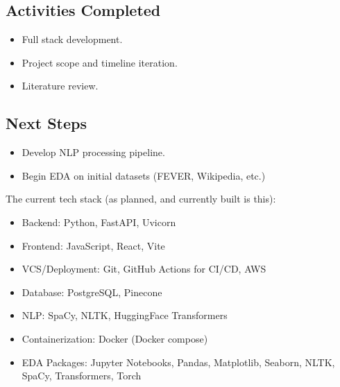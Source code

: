 \documentclass[11pt,letterpaper]{article}
\newcommand{\activities}[1]{
    \subsection*{Activities Completed}
    #1
}
\newcommand{\findings}[1]{
    \subsection*{Key Findings}
    #1
}
\newcommand{\nextSteps}[1]{
    \subsection*{Next Steps}
    #1
}
\begin{document}
\activities{
\begin{itemize}
    \item Full stack development.
    \item Project scope and timeline iteration.
    \item Literature review.
\end{itemize}

}

    

\nextSteps{
    \begin{itemize}
        \item Develop NLP processing pipeline.
        \item Begin EDA on initial datasets (FEVER, Wikipedia, etc.)
    \end{itemize}

    The current tech stack (as planned, and currently built is this):
    \begin{itemize}
        \item Backend: Python, FastAPI, Uvicorn
        \item Frontend: JavaScript, React, Vite
        \item VCS/Deployment: Git, GitHub Actions for CI/CD, AWS
        \item Database: PostgreSQL, Pinecone
        \item NLP: SpaCy, NLTK, HuggingFace Transformers
        \item Containerization: Docker (Docker compose)
        \item EDA Packages: Jupyter Notebooks, Pandas, Matplotlib, Seaborn, NLTK, SpaCy, Transformers, Torch
    \end{itemize}
}
\end{document}
